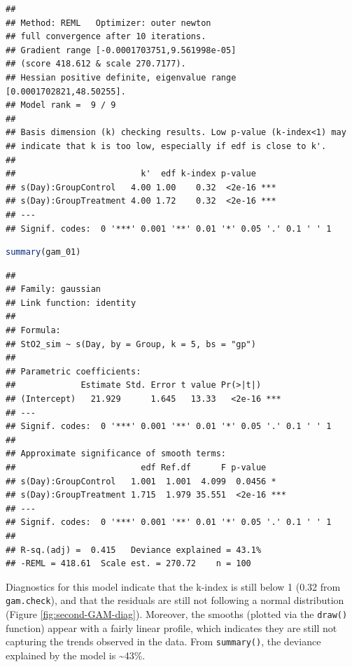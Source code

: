 \documentclass[
]{article}
\newcommand{\passthrough}[1]{#1}
\begin{document}
\begin{lstlisting}
## 
## Method: REML   Optimizer: outer newton
## full convergence after 10 iterations.
## Gradient range [-0.0001703751,9.561998e-05]
## (score 418.612 & scale 270.7177).
## Hessian positive definite, eigenvalue range [0.0001702821,48.50255].
## Model rank =  9 / 9 
## 
## Basis dimension (k) checking results. Low p-value (k-index<1) may
## indicate that k is too low, especially if edf is close to k'.
## 
##                         k'  edf k-index p-value    
## s(Day):GroupControl   4.00 1.00    0.32  <2e-16 ***
## s(Day):GroupTreatment 4.00 1.72    0.32  <2e-16 ***
## ---
## Signif. codes:  0 '***' 0.001 '**' 0.01 '*' 0.05 '.' 0.1 ' ' 1
\end{lstlisting}

\begin{lstlisting}[language=R]
summary(gam_01)
\end{lstlisting}

\begin{lstlisting}
## 
## Family: gaussian 
## Link function: identity 
## 
## Formula:
## StO2_sim ~ s(Day, by = Group, k = 5, bs = "gp")
## 
## Parametric coefficients:
##             Estimate Std. Error t value Pr(>|t|)    
## (Intercept)   21.929      1.645   13.33   <2e-16 ***
## ---
## Signif. codes:  0 '***' 0.001 '**' 0.01 '*' 0.05 '.' 0.1 ' ' 1
## 
## Approximate significance of smooth terms:
##                         edf Ref.df      F p-value    
## s(Day):GroupControl   1.001  1.001  4.099  0.0456 *  
## s(Day):GroupTreatment 1.715  1.979 35.551  <2e-16 ***
## ---
## Signif. codes:  0 '***' 0.001 '**' 0.01 '*' 0.05 '.' 0.1 ' ' 1
## 
## R-sq.(adj) =  0.415   Deviance explained = 43.1%
## -REML = 418.61  Scale est. = 270.72    n = 100
\end{lstlisting}

Diagnostics for this model indicate that the k-index is still below 1 (0.32 from \passthrough{\lstinline!gam.check!}), and that the residuals are still not following a normal distribution (Figure \ref{fig:second-GAM-diag}). Moreover, the smooths (plotted via the \passthrough{\lstinline!draw()!} function) appear with a fairly linear profile, which indicates they are still not capturing the trends observed in the data. From \passthrough{\lstinline!summary()!}, the deviance explained by the model is \textasciitilde43\%.
\end{document}
